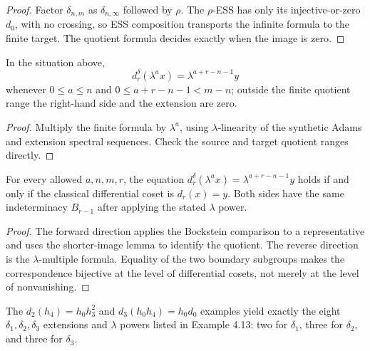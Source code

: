 \begin{proof}
  Factor $\delta_{n,m}$ as $\delta_{n,\infty}$ followed by $\rho$.  The
  $\rho$-ESS has only its injective-or-zero $d_0$, with no crossing, so ESS
  composition transports the infinite formula to the finite target.  The
  quotient formula decides exactly when the image is zero.
\end{proof}

\begin{corollary}
  \label{cor:delta-ess-lambda-multiples}
  \notready
  In the situation above,
  \[
    d_r^\delta(\lambda^a x)=\lambda^{a+r-n-1}y
  \]
  whenever $0\le a\le n$ and
  $0\le a+r-n-1<m-n$; outside the finite quotient range the right-hand side
  and the extension are zero.
\end{corollary}

\begin{proof}
  Multiply the finite formula by $\lambda^a$, using $\lambda$-linearity of the
  synthetic Adams and extension spectral sequences.  Check the source and
  target quotient ranges directly.
\end{proof}

\begin{theorem}
  \label{thm:delta-classical-equivalence}
  \notready
  For every allowed $a,n,m,r$, the equation
  $d_r^\delta(\lambda^a x)=\lambda^{a+r-n-1}y$ holds if and only if the
  classical differential coset is $d_r(x)=y$.  Both sides have the same
  indeterminacy $B_{r-1}$ after applying the stated $\lambda$ power.
\end{theorem}

\begin{proof}
  The forward direction applies the Bockstein comparison to a representative
  and uses the shorter-image lemma to identify the quotient.  The reverse
  direction is the $\lambda$-multiple formula.  Equality of the two boundary
  subgroups makes the correspondence bijective at the level of differential
  cosets, not merely at the level of nonvanishing.
\end{proof}

\begin{proposition}
  \label{prop:delta-14-stem-regression}
  \notready
  The $d_2(h_4)=h_0h_3^2$ and
  $d_3(h_0h_4)=h_0d_0$ examples yield exactly the eight
  $\delta_1,\delta_2,\delta_3$ extensions and $\lambda$ powers listed in
  Example 4.13: two for $\delta_1$, three for $\delta_2$, and three for
  $\delta_3$.
\end{proposition}

